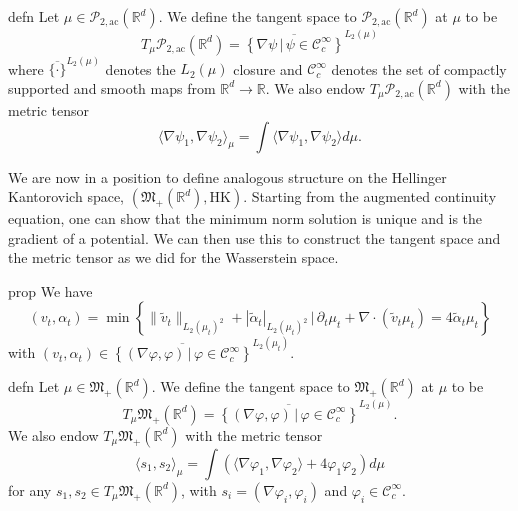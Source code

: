 \documentclass{article}
\newcommand{\pac}{\mathcal{P}_{2, \text{ac}}(\mathbb{R}^d)}
\newcommand{\posm}{\mathfrak{M}_+(\mathbb{R}^d)}
\begin{document}
\begin{restatable}{defn}{}
    Let $\mu \in \pac$. We define the tangent space to $\pac$ at $\mu$ to be 
    \begin{equation}
        T_\mu \pac = \overline{\left\{\nabla \psi \, | \, \psi \in \mathcal{C}_c^{\infty}\right\}}^{L_2(\mu)}
    \end{equation}
    where $\overline{\{\cdot \}}^{L_2(\mu)}$ denotes the $L_2(\mu)$ closure and $\mathcal{C}_c^{\infty}$ denotes the set of compactly supported and smooth maps from $\mathbb{R}^d \rightarrow \mathbb{R}$. We also endow $T_\mu \pac$ with the metric tensor
    \begin{equation}
        \langle \nabla \psi_1, \nabla \psi_2\rangle_{\mu} = \int \langle\nabla\psi_1, \nabla\psi_2 \rangle d\mu. 
    \end{equation}
\end{restatable}
We are now in a position to define analogous structure on the Hellinger Kantorovich space, $(\posm, \text{HK})$. Starting from the augmented continuity equation, one can show that the minimum norm solution is unique and is the gradient of a potential. We can then use this to construct the tangent space and the metric tensor as we did for the Wasserstein space.
\begin{restatable}{prop}{}
    We have
    \begin{equation*}
        (v_t, \alpha_t) = \min\left\{\|\tilde v_t\|_{L_2(\mu_t)^2} + |\tilde \alpha_t|_{L_2(\mu_t)^2  }  \, \Big| \, \partial_t\mu_t + \nabla \cdot (\tilde v_t \mu_t) = 4\tilde \alpha_t \mu_t\right\}
    \end{equation*}
    with $(v_t, \alpha_t) \in \overline{\left\{(\nabla \varphi, \varphi) \, | \, \varphi \in \mathcal{C}^{\infty}_{c}\right\}}^{L_2(\mu_t)}$.
\end{restatable}
\begin{restatable}{defn}{}
    Let $\mu \in \posm$. We define the tangent space to $\posm$ at $\mu$ to be 
    \begin{equation}
        T_\mu \posm = \overline{\left\{(\nabla \varphi, \varphi) \, | \, \varphi \in \mathcal{C}_c^{\infty}\right\}}^{L_2(\mu)}.
    \end{equation}
    We also endow $T_\mu \posm$ with the metric tensor
    \begin{equation}
        \langle s_1,  s_2\rangle_{\mu} = \int \left(\langle\nabla\varphi_1, \nabla\varphi_2\rangle + 4\varphi_1\varphi_2 \right) d\mu
    \end{equation}
    for any $s_1, s_2\in T_\mu \posm$, with $s_i = (\nabla \varphi_i, \varphi_i)$ and $\varphi_i \in \mathcal{C}_c^\infty$. 
\end{restatable}
\end{document}
